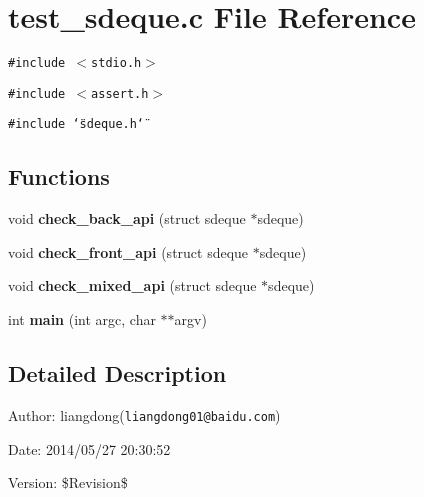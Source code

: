 \section{test\_\-sdeque.c File Reference}
\label{test__sdeque_8c}
{\tt \#include $<$stdio.h$>$}\par
{\tt \#include $<$assert.h$>$}\par
{\tt \#include \char`\"{}sdeque.h\char`\"{}}\par
\subsection*{Functions}
\begin{CompactItemize}
\item 
void {\bf check\_\-back\_\-api} (struct sdeque $\ast$sdeque)\label{test__sdeque_8c_a0}

\item 
void {\bf check\_\-front\_\-api} (struct sdeque $\ast$sdeque)\label{test__sdeque_8c_a1}

\item 
void {\bf check\_\-mixed\_\-api} (struct sdeque $\ast$sdeque)\label{test__sdeque_8c_a2}

\item 
int {\bf main} (int argc, char $\ast$$\ast$argv)\label{test__sdeque_8c_a3}

\end{CompactItemize}


\subsection{Detailed Description}
\begin{Desc}
\item[Author:]liangdong({\tt liangdong01@baidu.com}) \end{Desc}
\begin{Desc}
\item[Date:]2014/05/27 20:30:52 \end{Desc}
\begin{Desc}
\item[Version:]\$Revision\$ \end{Desc}
